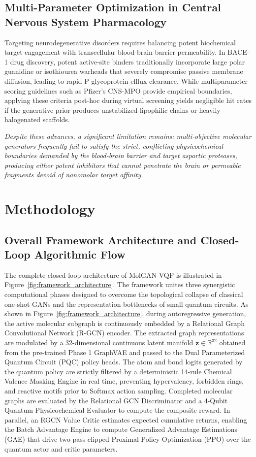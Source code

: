 \documentclass[10pt,a4paper]{article}
\begin{document}
\subsection{Multi-Parameter Optimization in Central Nervous System Pharmacology}
Targeting neurodegenerative disorders requires balancing potent biochemical target engagement with transcellular blood-brain barrier permeability. In BACE-1 drug discovery, potent active-site binders traditionally incorporate large polar guanidine or isothiourea warheads that severely compromise passive membrane diffusion, leading to rapid P-glycoprotein efflux clearance. While multiparameter scoring guidelines such as Pfizer's CNS-MPO provide empirical boundaries, applying these criteria post-hoc during virtual screening yields negligible hit rates if the generative prior produces unstabilized lipophilic chains or heavily halogenated scaffolds.
\par\vspace{0.08cm}
\noindent\textit{Despite these advances, a significant limitation remains: multi-objective molecular generators frequently fail to satisfy the strict, conflicting physicochemical boundaries demanded by the blood-brain barrier and target aspartic proteases, producing either potent inhibitors that cannot penetrate the brain or permeable fragments devoid of nanomolar target affinity.}
\clearpage

\section{Methodology}

\subsection{Overall Framework Architecture and Closed-Loop Algorithmic Flow}
The complete closed-loop architecture of MolGAN-VQP is illustrated in Figure~\ref{fig:framework_architecture}. The framework unites three synergistic computational phases designed to overcome the topological collapse of classical one-shot GANs and the representation bottlenecks of small quantum circuits. As shown in Figure~\ref{fig:framework_architecture}, during autoregressive generation, the active molecular subgraph is continuously embedded by a Relational Graph Convolutional Network (R-GCN) encoder. The extracted graph representations are modulated by a 32-dimensional continuous latent manifold $\mathbf{z} \in \mathbb{R}^{32}$ obtained from the pre-trained Phase 1 GraphVAE and passed to the Dual Parameterized Quantum Circuit (PQC) policy heads. The atom and bond logits generated by the quantum policy are strictly filtered by a deterministic 14-rule Chemical Valence Masking Engine in real time, preventing hypervalency, forbidden rings, and reactive motifs prior to Softmax action sampling. Completed molecular graphs are evaluated by the Relational GCN Discriminator and a 4-Qubit Quantum Physicochemical Evaluator to compute the composite reward. In parallel, an RGCN Value Critic estimates expected cumulative returns, enabling the Batch Advantage Engine to compute Generalized Advantage Estimations (GAE) that drive two-pass clipped Proximal Policy Optimization (PPO) over the quantum actor and critic parameters.
\end{document}
